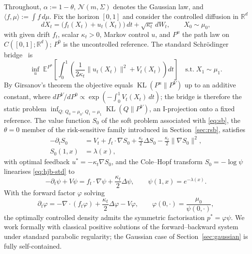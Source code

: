 \documentclass[letterpaper,10pt,conference]{IEEEtran}
\newcommand{\KL}{\operatorname{KL}}
\newcommand{\EE}{\mathbb{E}}
\newcommand{\RR}{\mathbb{R}}
\newcommand{\cN}{\mathcal{N}}
\begin{document}
	Throughout, $\alpha:=1-\theta$, $\cN(m,\Sigma)$ denotes the Gaussian law, and
	$\langle f,\mu\rangle:=\int f\,d\mu$. Fix the horizon $[0,1]$ and consider the controlled diffusion in $\RR^d$
	\begin{equation}
		\label{eq:sde}
		dX_t = \bigl(f_t(X_t)+u_t(X_t)\bigr)\,dt+\sqrt{\kappa_t}\,dW_t,\qquad X_0\sim\mu_0,
	\end{equation}
	with given drift $f_t$, scalar $\kappa_t>0$, Markov control $u$, and $P^u$ the
	path law on $C([0,1];\RR^d)$; $P^0$ is the uncontrolled reference. The
	standard Schr\"odinger bridge~\cite{Leonard2014} is
	\begin{equation}
		\label{eq:sb}
		\inf_{u}\;\EE^{P^u}\!\left[\int_0^1\!\left(\frac{1}{2\kappa_t}\|u_t(X_t)\|^2+V_t(X_t)\right)dt\right]
		\quad\text{s.t.}\;X_1\sim\mu_1.
	\end{equation}
	By Girsanov's theorem the objective equals $\KL(P^u\|P^V)$ up to an additive
	constant, where $dP^V/dP^0\propto\exp(-\int_0^1 V_t(X_t)\,dt)$; the bridge is
	therefore the static problem
	$\inf_{Q:\,Q_0=\mu_0,\,Q_1=\mu_1}\KL(Q\|P^V)$, an I-projection onto a fixed
	reference. The value function $S_0$ of the soft problem associated with \eqref{eq:sb}, the $\theta=0$ member of the risk-sensitive family introduced in Section~\ref{sec:rsb}, satisfies
	\begin{equation}
		\label{eq:hjb-std}
		\begin{split}
			-\partial_t S_0 &= V_t+f_t\cdot\nabla S_0+\frac{\kappa_t}{2}\Delta S_0-\frac{\kappa_t}{2}\|\nabla S_0\|^2,\\
			S_0(1,x)&=\lambda(x),
		\end{split}
	\end{equation}
	with optimal feedback $u^*=-\kappa_t\nabla S_0$, and the Cole--Hopf transform
	$S_0=-\log\psi$ linearises \eqref{eq:hjb-std} to
	\begin{equation}
		\label{eq:psi-bwd}
		-\partial_t\psi+V\psi = f_t\cdot\nabla\psi+\frac{\kappa_t}{2}\Delta\psi,
		\qquad \psi(1,x)=e^{-\lambda(x)}.
	\end{equation}
	With the forward factor $\varphi$ solving
	\begin{equation}
		\label{eq:phi-fwd}
		\partial_t\varphi = -\nabla\cdot(f_t\varphi)+\frac{\kappa_t}{2}\Delta\varphi-V\varphi,
		\qquad \varphi(0,\cdot)=\frac{\mu_0}{\psi(0,\cdot)},
	\end{equation}
	the optimally controlled density admits the symmetric factorisation
	$p^*=\varphi\psi$. We work formally with classical positive solutions of the
	forward--backward system under standard parabolic regularity; the Gaussian
	case of Section~\ref{sec:gaussian} is fully self-contained.
	
\end{document}
